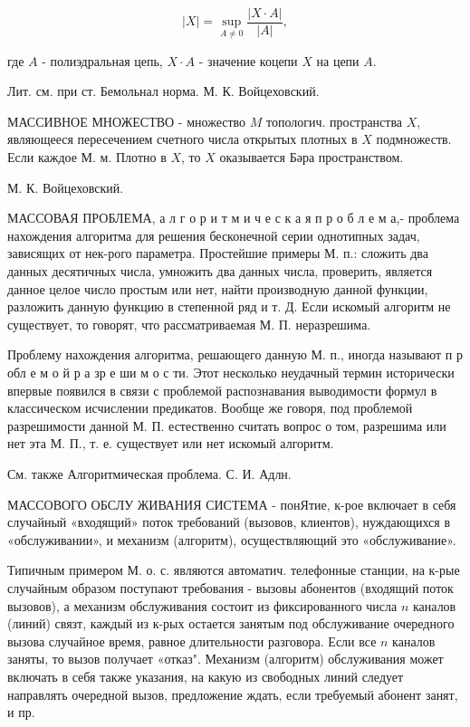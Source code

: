 \documentclass[10pt]{article}
\begin{document}
\[

|X|=\sup _{A \neq 0} \frac{|X \cdot A|}{|A|},

\]



где $A$ - полиэдральная цепь, $X \cdot A$ - значение коцепи $X$ на цепи $A$.



Лит. см. при ст. Бемольнал норма. М. К. Войцеховский.



МАССИВНОЕ МНОЖЕСТВО - множество $M$ топологич. пространства $X$, являющееся пересечением счетного числа открытых плотных в $X$ подмножеств. Если каждое М. м. Плотно в $X$, то $X$ оказывается Бәра пространством.



М. К. Войцеховский.



МАССОВАЯ ПРОБЛЕМА, а л г о р и т м и ч е с к а я п р о б л е м а,- проблема нахождения алгоритма для решения бесконечной серии однотипных задач, зависящих от нек-рого параметра. Простейшие примеры М. п.: сложить два данных десятичных числа, умножить два данных числа, проверить, является данное целое число простым или нет, найти производную данной функции, разложить данную функцию в степенной ряд и т. Д. Если искомый алгоритм не существует, то говорят, что рассматриваемая М. П. неразрешима.



Проблему нахождения алгоритма, решающего данную М. п., иногда называют п р обл е м о й р а зр е ши м о с ти. Этот несколько неудачный термин исторически впервые появился в связи с проблемой распознавания выводимости формул в классическом исчислении предикатов. Вообще же говоря, под проблемой разрешимости данной М. П. естественно считать вопрос о том, разрешима или нет эта М. П., т. е. существует или нет искомый алгоритм.



См. также Алгоритмическая проблема. С. И. Адлн.



МАССОВОГО ОБСЛУ ЖИВАНИЯ СИСТЕМА - понЯтие, к-рое включает в себя случайный «входящий» поток требований (вызовов, клиентов), нуждающихся в «обслуживании», и механизм (алгоритм), осуществляющий это «обслуживание».



Типичным примером М. о. с. являются автоматич. телефонные станции, на к-рые случайным образом поступают требования - вызовы абонентов (входящий поток вызовов), а механизм обслуживания состоит из фиксированного числа $n$ каналов (линий) связт, каждый из к-рых остается занятым под обслуживание очередного вызова случайное время, равное длительности разговора. Если все $n$ каналов заняты, то вызов получает «отказ". Механизм (алгоритм) обслуживания может включать в себя также указания, на какую из свободных линий следует направлять очередной вызов, предложение ждать, если требуемый абонент занят, и пр.
\end{document}
